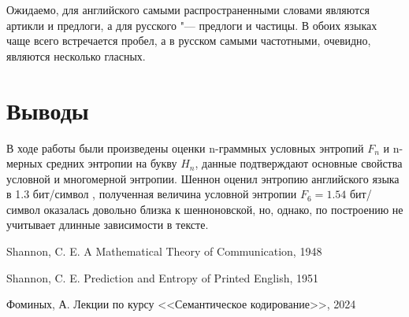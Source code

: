 \documentclass[a4paper,12pt]{article}
\begin{document}
	Ожидаемо, для английского самыми распространенными словами являются артикли и предлоги, а для русского "--- предлоги и частицы. В обоих языках чаще всего встречается пробел, а в русском самыми частотными, очевидно, являются несколько гласных.
	
	\section*{Выводы}
	
	В ходе работы были произведены оценки n-граммных условных энтропий $F_n$ и n-мерных средних энтропии на букву $H_n$, данные подтверждают основные свойства условной и многомерной энтропии. Шеннон оценил энтропию английского языка в 1.3 бит/символ \cite{shannon1951H}, полученная величина условной энтропии $ F_6 = 1.54 $ бит/символ оказалась довольно близка к шенноновской, но, однако, по построению не учитывает длинные зависимости в тексте.
	
	
	\clearpage
	\newpage
	\begin{thebibliography}{0}
		 Shannon, C. E. A Mathematical Theory of Communication, 1948
		
		 Shannon, C. E. Prediction and Entropy of Printed English, 1951
		
		 Фоминых, А. Лекции по курсу <<Семантическое кодирование>>, 2024
		
		
		
		
	\end{thebibliography}
	
	
\end{document}
